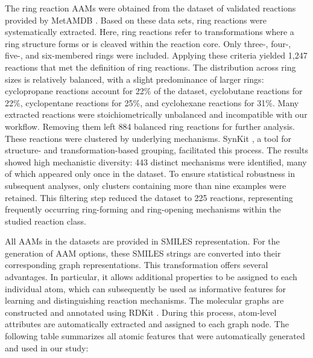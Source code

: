 \documentclass[a4paper,12pt]{article} %
\begin{document}
The ring reaction AAMs were obtained from the dataset of validated reactions provided by MetAMDB \cite{MetAMDB}. Based on these data sets, ring reactions were systematically extracted. Here, ring reactions refer to transformations where a ring structure forms or is cleaved within the reaction core. Only three-, four-, five-, and six-membered rings were included. Applying these criteria yielded 1,247 reactions that met the definition of ring reactions. The distribution across ring sizes is relatively balanced, with a slight predominance of larger rings: cyclopropane reactions account for 22\% of the dataset, cyclobutane reactions for 22\%, cyclopentane reactions for 25\%, and cyclohexane reactions for 31\%. Many extracted reactions were stoichiometrically unbalanced and incompatible with our workflow. Removing them left 884 balanced ring reactions for further analysis. These reactions were clustered by underlying mechanisms. SynKit \cite{synkit}, a tool for structure- and transformation-based grouping, facilitated this process. The results showed high mechanistic diversity: 443 distinct mechanisms were identified, many of which appeared only once in the dataset. To ensure statistical robustness in subsequent analyses, only clusters containing more than nine examples were retained. This filtering step reduced the dataset to 225 reactions, representing frequently occurring ring-forming and ring-opening mechanisms within the studied reaction class.

\bigskip
All AAMs in the datasets are provided in SMILES representation. For the generation of AAM options, these SMILES strings are converted into their corresponding graph representations. This transformation offers several advantages. In particular, it allows additional properties to be assigned to each individual atom, which can subsequently be used as informative features for learning and distinguishing reaction mechanisms. The molecular graphs are constructed and annotated using RDKit \cite{rdkit}. During this process, atom-level attributes are automatically extracted and assigned to each graph node. The following table summarizes all atomic features that were automatically generated and used in our study:
\end{document}
